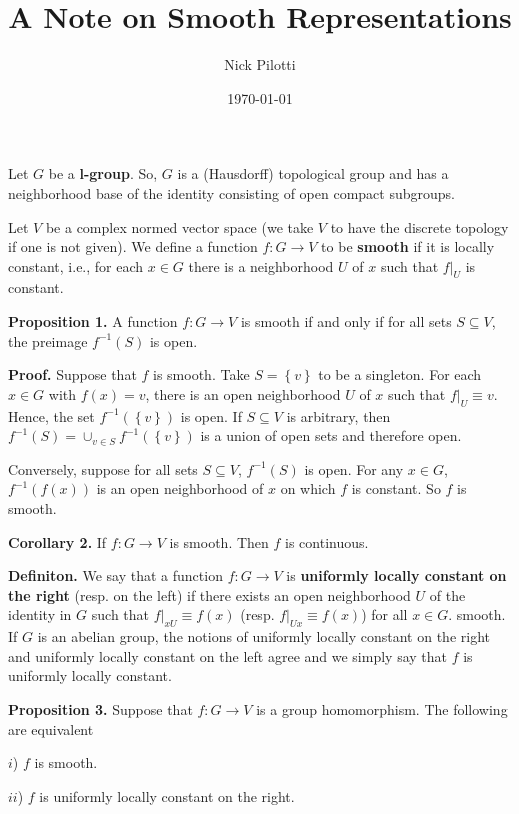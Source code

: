 \documentclass[12pt]{article}
\title{A Note on Smooth Representations}
\author{Nick Pilotti}
\date{\today}
\begin{document}
\maketitle

Let $G$ be a \textbf{l-group}. So, $G$ is a (Hausdorff) topological group and
has a neighborhood base of the identity consisting of open compact subgroups.

Let $V$ be a complex normed vector space (we take $V$ to have the discrete
topology if one is not given). We define a function $f : G \rightarrow V$ to be
\textbf{smooth} if it is locally constant, i.e., for each $x \in G$ there is a
neighborhood $U$ of $x$ such that $f|_{U}$ is constant.

\textbf{Proposition 1.} A function $f : G \rightarrow V$ is smooth if and only if
for all sets $S \subseteq V$, the preimage $f^{-1}\left(S\right)$ is open.

\textbf{Proof.} Suppose that $f$ is smooth. Take $S = \left\{v\right\}$ to be a
singleton. For each $x \in G$ with $f\left(x\right) = v$, there is an open
neighborhood $U$ of $x$ such that $f|_{U} \equiv v$. Hence, the set
$f^{-1}\left(\left\{v\right\}\right)$ is open. If $S \subseteq V$ is arbitrary,
then $f^{-1}\left(S\right) = \cup_{v \in S} f^{-1}\left(\left\{v\right\}\right)$
is a union of open sets and therefore open.

Conversely, suppose for all sets $S \subseteq V$, $f^{-1}\left(S\right)$ is
open. For any $x \in G$, $f^{-1}\left(f\left(x\right)\right)$ is an open
neighborhood of $x$ on which $f$ is constant. So $f$ is smooth.

\textbf{Corollary 2.} If $f : G \rightarrow V$ is smooth. Then $f$ is continuous.

\textbf{Definiton.} We say that a function $f : G \rightarrow V$ is
\textbf{uniformly locally constant on the right} (resp. on the left) if there
exists an open neighborhood $U$ of the identity in $G$ such that $f|_{xU} \equiv
f\left(x\right)$ (resp. $f|_{Ux} \equiv f\left(x\right)$) for all $x \in G$.
smooth. If $G$ is an abelian group, the notions of uniformly locally constant on
the right and uniformly locally constant on the left agree and we simply say
that $f$ is uniformly locally constant.

\textbf{Proposition 3.} Suppose that $f : G \rightarrow V$ is a group
homomorphism. The following are equivalent

$i$) $f$ is smooth.

$ii$) $f$ is uniformly locally constant on the right.
\end{document}

